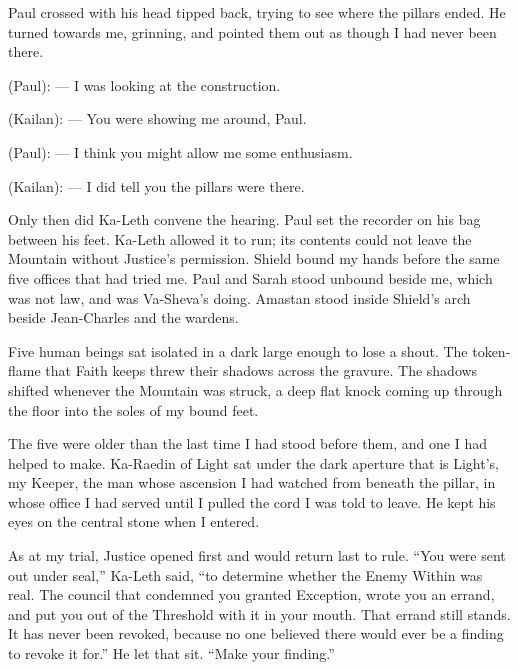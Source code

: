 Paul crossed with his head tipped back, trying to see where the pillars ended. He turned towards me, grinning, and pointed them out as though I had never been there.\par

\begin{room}

(Paul): --- I was looking at the construction.

(Kailan): --- You were showing me around, Paul.

(Paul): --- I think you might allow me some enthusiasm.

(Kailan): --- I did tell you the pillars were there.

\end{room}

\ornament

Only then did Ka-Leth convene the hearing. Paul set the recorder on his bag between his feet. Ka-Leth allowed it to run; its contents could not leave the Mountain without Justice's permission. Shield bound my hands before the same five offices that had tried me. Paul and Sarah stood unbound beside me, which was not law, and was Va-Sheva's doing. Amastan stood inside Shield's arch beside Jean-Charles and the wardens.\par

Five human beings sat isolated in a dark large enough to lose a shout. The token-flame that Faith keeps threw their shadows across the gravure. The shadows shifted whenever the Mountain was struck, a deep flat knock coming up through the floor into the soles of my bound feet.\par

The five were older than the last time I had stood before them, and one I had helped to make. Ka-Raedin of Light sat under the dark aperture that is Light's, my Keeper, the man whose ascension I had watched from beneath the pillar, in whose office I had served until I pulled the cord I was told to leave. He kept his eyes on the central stone when I entered.\par

As at my trial, Justice opened first and would return last to rule. ``You were sent out under seal,'' Ka-Leth said, ``to determine whether the Enemy Within was real. The council that condemned you granted Exception, wrote you an errand, and put you out of the Threshold with it in your mouth. That errand still stands. It has never been revoked, because no one believed there would ever be a finding to revoke it for.'' He let that sit. ``Make your finding.''\par

